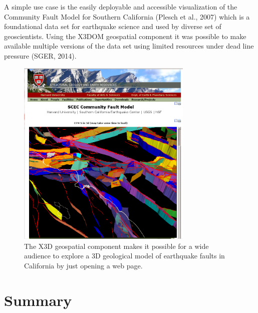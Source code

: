 \documentclass{acmsiggraph}                     %
\begin{document}
A simple use case is the easily deployable and accessible visualization of the Community Fault Model for Southern California (Plesch et al., 2007) which is a foundational data set for earthquake science and used by diverse set of geoscientists. Using the X3DOM geospatial component it was possible to make available multiple versions of the data set using limited resources under dead line pressure (SGER, 2014).

\begin{figure}[htbp]
\centering
\includegraphics[width=3.3in]{Application_SCEC.png}
\caption{The X3D geospatial component makes it possible for a wide audience to explore a 3D geological model of earthquake faults in California by just opening a web page.}
\label{fig:Application_SCEC.png}
\end{figure}


\section{Summary}
\end{document}
